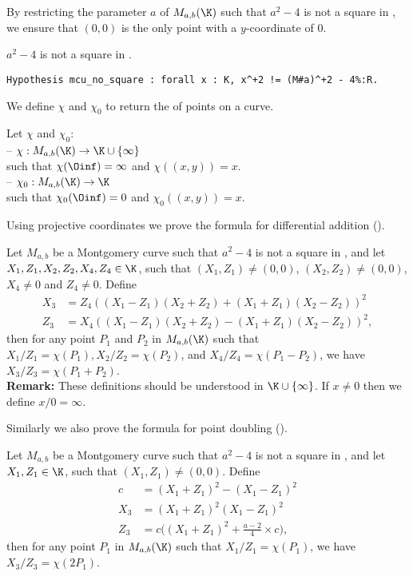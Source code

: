 By restricting the parameter $a$ of $M_{a,b}(\K)$ such that $a^2-4$ is not a
square in \K, we ensure that $(0,0)$ is the only point with a $y$-coordinate of $0$.
\begin{hypothesis}
\label{hyp:a_minus_4_not_square}
$a^2-4$ is not a square in \K.
\end{hypothesis}
\begin{lstlisting}[language=Coq]
Hypothesis mcu_no_square : forall x : K, x^+2 != (M#a)^+2 - 4%:R.
\end{lstlisting}

We define $\chi$ and $\chi_0$ to return the \xcoord of points on a curve.
\begin{dfn}Let $\chi$ and $\chi_0$:\\
-- $\chi : M_{a,b}(\K) \to \K \cup \{\infty\}$\\
  such that $\chi(\Oinf) = \infty$ and $\chi((x,y)) = x$.\\
-- $\chi_0 : M_{a,b}(\K) \to \K$\\
  such that $\chi_0(\Oinf) = 0$ and $\chi_0((x,y)) = x$.
\end{dfn}
Using projective coordinates we prove the formula for differential addition ().
\begin{lemma}
\label{lemma:xADD}
Let $M_{a,b}$ be a Montgomery curve such that $a^2-4$ is not a square in \K, and
let $X_1, Z_1, X_2, Z_2, X_4, Z_4 \in \K$, such that $(X_1,Z_1) \neq (0,0)$,
$(X_2,Z_2) \neq (0,0)$, $X_4 \neq 0$ and $Z_4 \neq 0$.
Define
\begin{align*}
X_3 &= Z_4((X_1 - Z_1)(X_2+Z_2) + (X_1+Z_1)(X_2-Z_2))^2\\
Z_3 &= X_4((X_1 - Z_1)(X_2+Z_2) - (X_1+Z_1)(X_2-Z_2))^2,
\end{align*}
then for any point $P_1$ and $P_2$ in $M_{a,b}(\K)$ such that
$X_1/Z_1 = \chi(P_1), X_2/Z_2 = \chi(P_2)$, and $X_4/Z_4 = \chi(P_1 - P_2)$,
we have $X_3/Z_3 = \chi(P_1+P_2)$.\\
\textbf{Remark:}
These definitions should be understood in $\K \cup \{\infty\}$.
If $x\ne 0$ then we define $x/0 = \infty$.
\end{lemma}
Similarly we also prove the formula for point doubling ().
\begin{lemma}
\label{lemma:xDBL}
Let $M_{a,b}$ be a Montgomery curve such that $a^2-4$ is not a square in \K, and
let $X_1, Z_1 \in \K$, such that $(X_1,Z_1) \neq (0,0)$. Define
\begin{align*}
  c &= (X_1 + Z_1)^2 - (X_1 - Z_1)^2\\
X_3 &= (X_1 + Z_1)^2(X_1-Z_1)^2\\
Z_3 &= c\Big((X_1 + Z_1)^2+\frac{a-2}{4}\times c\Big),
\end{align*}
then for any point $P_1$ in $M_{a,b}(\K)$ such that $X_1/Z_1 = \chi(P_1)$,
we have $X_3/Z_3 = \chi(2P_1)$.
\end{lemma}

